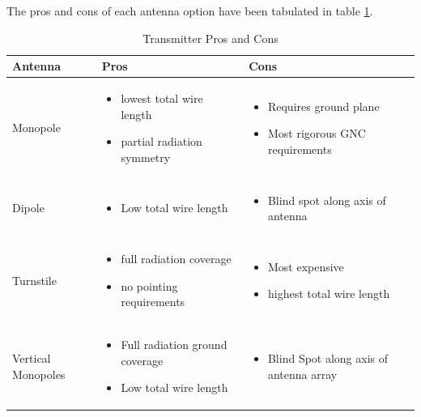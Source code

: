 The pros and cons of each antenna option have been tabulated in table \ref{tbl:antenna_procon}.
\begin{table}[H]
\centering
\begin{tabular}{|p{}|p{}|p{}|} 
\hline
\textbf{Antenna} & \textbf{Pros} & \textbf{Cons}
\\
\hline
     Monopole
     &
    \begin{itemize}
        \item lowest total wire length
        \item partial radiation symmetry
    \end{itemize}
    &
    \begin{itemize}
        \item Requires ground plane
        \item Most rigorous GNC requirements
    \end{itemize}
    \\
\hline
     Dipole
     &
    \begin{itemize}
        \item Low total wire length
    \end{itemize}
    &
        \begin{itemize}
        \item Blind spot along axis of antenna
    \end{itemize}
    \\
\hline
    Turnstile
    &
    \begin{itemize}
        \item full radiation coverage
        \item no pointing requirements
    \end{itemize}
    &
    \begin{itemize}
        \item Most expensive
        \item highest total wire length
    \end{itemize}
    \\
    \hline
    Vertical Monopoles
    &
    \begin{itemize}
        \item Full radiation ground coverage
        \item Low total wire length 
    \end{itemize}
    &
    \begin{itemize}
        \item Blind Spot along axis of antenna array
    \end{itemize}
    \\
\hline
\end{tabular}
\caption{Transmitter Pros and Cons \cite{isis_ground}}
\label{tbl:antenna_procon}
\end{table}

